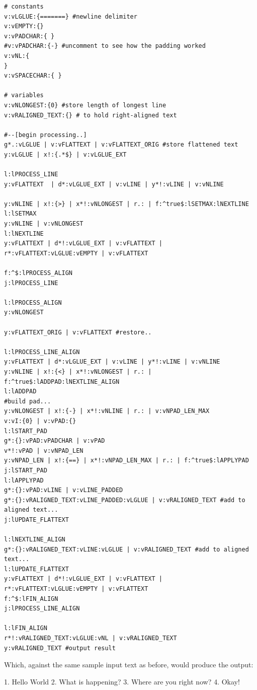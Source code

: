 \documentclass[a4paper, 18pt]{book} %
\begin{document}
{{{\begin{tcolorbox}[teaterminalstyle, title=T: EXAMPLE 6: ROBUST Right-alignment Program, breakable]
\begin{lstlisting}[language=TEA,breaklines=true,]
# constants
v:vLGLUE:{=======} #newline delimiter
v:vEMPTY:{}
v:vPADCHAR:{ }
#v:vPADCHAR:{-} #uncomment to see how the padding worked
v:vNL:{
}
v:vSPACECHAR:{ }

# variables
v:vNLONGEST:{0} #store length of longest line
v:vRALIGNED_TEXT:{} # to hold right-aligned text

#--[begin processing..]
g*.:vLGLUE | v:vFLATTEXT | v:vFLATTEXT_ORIG #store flattened text
y:vLGLUE | x!:{.*$} | v:vLGLUE_EXT

l:lPROCESS_LINE
y:vFLATTEXT  | d*:vLGLUE_EXT | v:vLINE | y*!:vLINE | v:vNLINE 

y:vNLINE | x!:{>} | x*!:vNLONGEST | r.: | f:^true$:lSETMAX:lNEXTLINE
l:lSETMAX
y:vNLINE | v:vNLONGEST
l:lNEXTLINE
y:vFLATTEXT | d*!:vLGLUE_EXT | v:vFLATTEXT | r*:vFLATTEXT:vLGLUE:vEMPTY | v:vFLATTEXT

f:^$:lPROCESS_ALIGN
j:lPROCESS_LINE

l:lPROCESS_ALIGN
y:vNLONGEST 

y:vFLATTEXT_ORIG | v:vFLATTEXT #restore..

l:lPROCESS_LINE_ALIGN
y:vFLATTEXT | d*:vLGLUE_EXT | v:vLINE | y*!:vLINE | v:vNLINE
y:vNLINE | x!:{<} | x*!:vNLONGEST | r.: | f:^true$:lADDPAD:lNEXTLINE_ALIGN
l:lADDPAD
#build pad...
y:vNLONGEST | x!:{-} | x*!:vNLINE | r.: | v:vNPAD_LEN_MAX
v:vI:{0} | v:vPAD:{}
l:lSTART_PAD
g*:{}:vPAD:vPADCHAR | v:vPAD
v*!:vPAD | v:vNPAD_LEN
y:vNPAD_LEN | x!:{==} | x*!:vNPAD_LEN_MAX | r.: | f:^true$:lAPPLYPAD
j:lSTART_PAD
l:lAPPLYPAD
g*:{}:vPAD:vLINE | v:vLINE_PADDED
g*:{}:vRALIGNED_TEXT:vLINE_PADDED:vLGLUE | v:vRALIGNED_TEXT #add to aligned text...
j:lUPDATE_FLATTEXT

l:lNEXTLINE_ALIGN
g*:{}:vRALIGNED_TEXT:vLINE:vLGLUE | v:vRALIGNED_TEXT #add to aligned text...
l:lUPDATE_FLATTEXT
y:vFLATTEXT | d*!:vLGLUE_EXT | v:vFLATTEXT | r*:vFLATTEXT:vLGLUE:vEMPTY | v:vFLATTEXT
f:^$:lFIN_ALIGN
j:lPROCESS_LINE_ALIGN

l:lFIN_ALIGN
r*!:vRALIGNED_TEXT:vLGLUE:vNL | v:vRALIGNED_TEXT
y:vRALIGNED_TEXT #output result
   \end{lstlisting}
  \end{tcolorbox}
 
 
\vspace{2em}

Which, against the same sample input text as before, would produce the output:



\vspace{2em}


     \begin{tcbverbatim}[title=T: SAMPLE OUTPUT from EXAMPLE 6]
             1. Hello World
      2. What is happening?
3. Where are you right now?
                   4. Okay!
  \end{tcbverbatim}
  
}}}
\end{document}
